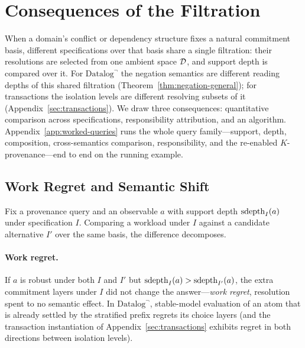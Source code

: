 \section{Consequences of the Filtration}
\label{sec:discussion}

When a domain's conflict or dependency structure fixes a natural commitment
basis, different specifications over that basis share a single filtration:
their resolutions are selected from one ambient space $\mathcal{D}$, and support
depth is compared over it. For $\mbox{Datalog}^\neg$ the negation semantics
are different reading depths of this shared filtration
(Theorem~\ref{thm:negation-general}); for transactions the isolation levels
are different resolving subsets of it (Appendix~\ref{sec:transactions}). We
draw three consequences: quantitative comparison across specifications,
responsibility attribution, and an algorithm.
Appendix~\ref{app:worked-queries} runs the whole query family---support, depth,
composition, cross-semantics comparison, responsibility, and the re-enabled
$K$-provenance---end to end on the running example.

\subsection{Work Regret and Semantic Shift}
\label{sec:regret-shift}

Fix a provenance query and an observable $a$ with support depth
$\operatorname{sdepth}_I(a)$ under specification $I$. Comparing a workload under $I$ against
a candidate alternative $I'$ over the same basis, the difference decomposes.

\paragraph{Work regret.}
If $a$ is robust under both $I$ and $I'$ but $\operatorname{sdepth}_I(a) > \operatorname{sdepth}_{I'}(a)$,
the extra commitment layers under $I$ did not change the answer---\emph{work
regret}, resolution spent to no semantic effect. In $\mbox{Datalog}^\neg$,
stable-model evaluation of an atom that is already settled by the stratified
prefix regrets its choice layers (and the transaction instantiation of
Appendix~\ref{sec:transactions} exhibits regret in both directions between
isolation levels).

